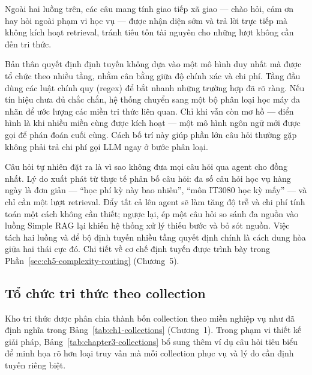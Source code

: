\documentclass[../DoAn.tex]{subfiles}
\begin{document}
Ngoài hai luồng trên, các câu mang tính giao tiếp xã giao --- chào hỏi, cảm ơn
hay hỏi ngoài phạm vi học vụ --- được nhận diện sớm và trả lời trực tiếp mà
không kích hoạt retrieval, tránh tiêu tốn tài nguyên cho những lượt không cần
đến tri thức.

Bản thân quyết định định tuyến không dựa vào một mô hình duy nhất mà được tổ
chức theo nhiều tầng, nhằm cân bằng giữa độ chính xác và chi phí. Tầng đầu dùng
các luật chính quy (regex) để bắt nhanh những trường hợp đã rõ ràng. Nếu tín
hiệu chưa đủ chắc chắn, hệ thống chuyển sang một bộ phân loại học máy đa nhãn để
ước lượng các miền tri thức liên quan. Chỉ khi vẫn còn mơ hồ --- điển hình là
khi nhiều miền cùng được kích hoạt --- một mô hình ngôn ngữ mới được gọi để phán
đoán cuối cùng. Cách bố trí này giúp phần lớn câu hỏi thường gặp không phải trả
chi phí gọi LLM ngay ở bước phân loại.

Câu hỏi tự nhiên đặt ra là vì sao không đưa mọi câu hỏi qua agent cho đồng nhất.
Lý do xuất phát từ thực tế phân bố câu hỏi: đa số câu hỏi học vụ hàng ngày là
đơn giản --- ``học phí kỳ này bao nhiêu'', ``môn IT3080 học kỳ mấy'' --- và chỉ
cần một lượt retrieval. Đẩy tất cả lên agent sẽ làm tăng độ trễ và chi phí tính
toán một cách không cần thiết; ngược lại, ép một câu hỏi so sánh đa nguồn vào
luồng Simple RAG lại khiến hệ thống xử lý thiếu bước và bỏ sót nguồn. Việc tách
hai luồng và để bộ định tuyến nhiều tầng quyết định chính là cách dung hòa giữa
hai thái cực đó. Chi tiết về cơ chế định tuyến được trình bày trong
Phần~\ref{sec:ch5-complexity-routing} (Chương~5).

\subsection{Tổ chức tri thức theo collection}

Kho tri thức được phân chia thành bốn collection theo miền nghiệp vụ như đã
định nghĩa trong Bảng~\ref{tab:ch1-collections} (Chương~1). Trong phạm vi thiết
kế giải pháp, Bảng~\ref{tab:chapter3-collections} bổ sung thêm ví dụ câu hỏi
tiêu biểu để minh họa rõ hơn loại truy vấn mà mỗi collection phục vụ và lý do
cần định tuyến riêng biệt.
\end{document}
